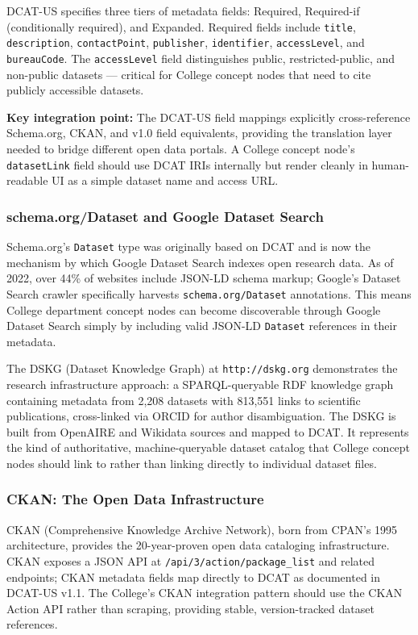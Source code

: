 \documentclass[11pt,letterpaper]{article}
\begin{document}
DCAT-US specifies three tiers of metadata fields: Required, Required-if (conditionally required), and Expanded. Required fields include \texttt{title}, \texttt{description}, \texttt{contactPoint}, \texttt{publisher}, \texttt{identifier}, \texttt{accessLevel}, and \texttt{bureauCode}. The \texttt{accessLevel} field distinguishes public, restricted-public, and non-public datasets --- critical for College concept nodes that need to cite publicly accessible datasets.

\textbf{Key integration point:} The DCAT-US field mappings explicitly cross-reference Schema.org, CKAN, and v1.0 field equivalents, providing the translation layer needed to bridge different open data portals. A College concept node's \texttt{datasetLink} field should use DCAT IRIs internally but render cleanly in human-readable UI as a simple dataset name and access URL.

\subsubsection{schema.org/Dataset and Google Dataset Search}

Schema.org's \texttt{Dataset} type was originally based on DCAT and is now the mechanism by which Google Dataset Search indexes open research data. As of 2022, over 44\% of websites include JSON-LD schema markup; Google's Dataset Search crawler specifically harvests \texttt{schema.org/Dataset} annotations. This means College department concept nodes can become discoverable through Google Dataset Search simply by including valid JSON-LD \texttt{Dataset} references in their metadata.

The DSKG (Dataset Knowledge Graph) at \texttt{http://dskg.org} demonstrates the research infrastructure approach: a SPARQL-queryable RDF knowledge graph containing metadata from 2,208 datasets with 813,551 links to scientific publications, cross-linked via ORCID for author disambiguation. The DSKG is built from OpenAIRE and Wikidata sources and mapped to DCAT. It represents the kind of authoritative, machine-queryable dataset catalog that College concept nodes should link to rather than linking directly to individual dataset files.

\subsubsection{CKAN: The Open Data Infrastructure}

CKAN (Comprehensive Knowledge Archive Network), born from CPAN's 1995 architecture, provides the 20-year-proven open data cataloging infrastructure. CKAN exposes a JSON API at \texttt{/api/3/action/package\_list} and related endpoints; CKAN metadata fields map directly to DCAT as documented in DCAT-US v1.1. The College's CKAN integration pattern should use the CKAN Action API rather than scraping, providing stable, version-tracked dataset references.
\end{document}
